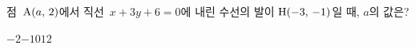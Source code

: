점~$\mathrm{A}(a,\,2)$에서 직선~$x+3y+6=0$에 내린 수선의 발이 $\mathrm{H}(-3,\,-1)$일 때, $a$의 값은?
\begin{choices32}{$-2$}{$-1$}{$0$}{$1$}{$2$}\end{choices32}
